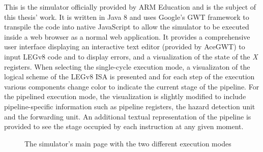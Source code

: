 This is the simulator officially provided by ARM Education and is the subject of this thesis' work. It is written in Java 8 and uses Google's GWT framework to transpile the code into native JavaScript to allow the simulator to be executed inside a web browser as a normal web application. It provides a comprehensive user interface displaying an interactive text editor (provided by AceGWT) to input LEGv8 code and to display errors, and a visualization of the state of the \emph{X} registers.
When selecting the single-cycle execution mode, a visualizaton of the logical scheme of the LEGv8 ISA is presented and for each step of the execution various components change color to indicate the current stage of the pipeline. For the pipelined execution mode, the visualization is slightly modified to include pipeline-specific information such as pipeline registers, the hazard detection unit and the forwarding unit. An additional textual representation of the pipeline is provided to see the stage occupied by each instruction at any given moment.

\begin{figure}[H]
	\centering
	
	\caption{The simulator's main page with the two different execution modes}
\end{figure}

